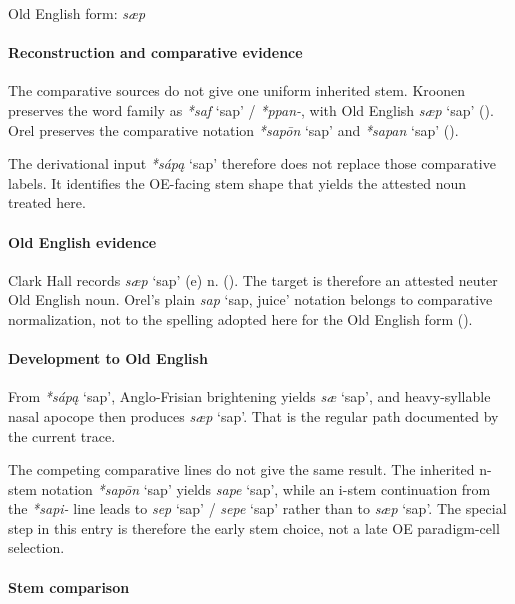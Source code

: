 \documentclass[
  british,
  a4paper,
]{article}
\providecommand{\Recon}[1]{\emph{*#1}}
\begin{document}
Old English form: \emph{sæp}

\paragraph{Reconstruction and comparative
evidence}\label{reconstruction-and-comparative-evidence-109}

The comparative sources do not give one uniform inherited stem. Kroonen
preserves the word family as \Recon{saf} `sap' / \emph{*ppan-}, with Old
English \emph{sæp} `sap' (). Orel preserves the comparative notation \Recon{sapōn} `sap' and
\Recon{sapan} `sap' ().

The derivational input \Recon{sápą} `sap' therefore does not replace
those comparative labels. It identifies the OE-facing stem shape that
yields the attested noun treated here.

\paragraph{Old English evidence}\label{old-english-evidence-111}

Clark Hall records {\emph{sæp}} `sap' (e) n.
(). The target is
therefore an attested neuter Old English noun. Orel's plain {\emph{sap}}
`sap, juice' notation belongs to comparative normalization, not to the
spelling adopted here for the Old English form
().

\paragraph{Development to Old
English}\label{development-to-old-english-109}

From \Recon{sápą} `sap', Anglo-Frisian brightening yields \emph{sæ}
`sap', and heavy-syllable nasal apocope then produces {\emph{sæp}}
`sap'. That is the regular path documented by the current trace.

The competing comparative lines do not give the same result. The
inherited n-stem notation \Recon{sapōn} `sap' yields {\emph{sape}}
`sap', while an i-stem continuation from the {\emph{*sapi-}} line leads
to {\emph{sep}} `sap' / {\emph{sepe}} `sap' rather than to {\emph{sæp}}
`sap'. The special step in this entry is therefore the early stem
choice, not a late OE paradigm-cell selection.

\paragraph{Stem comparison}\label{stem-comparison-5}
\end{document}
